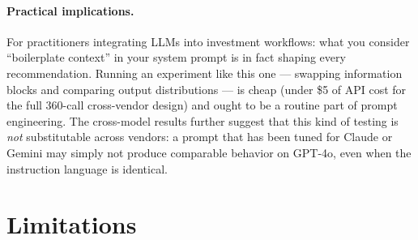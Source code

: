 \documentclass[11pt]{article}
\begin{document}
\paragraph{Practical implications.}
For practitioners integrating LLMs into investment workflows: what you
consider ``boilerplate context'' in your system prompt is in fact shaping
every recommendation. Running an experiment like this one --- swapping
information blocks and comparing output distributions --- is cheap
(under \$5 of API cost for the full 360-call cross-vendor design) and
ought to be a routine part of prompt engineering. The cross-model
results further suggest that this kind of testing is \emph{not}
substitutable across vendors: a prompt that has been tuned for Claude
or Gemini may simply not produce comparable behavior on GPT-4o, even
when the instruction language is identical.

\section{Limitations}
\end{document}
